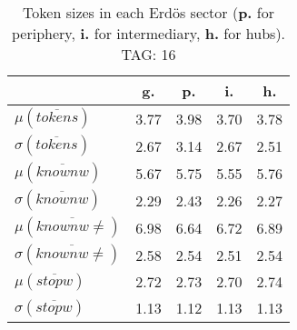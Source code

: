 \begin{table}[h!]
\begin{center}
\begin{tabular}{| l | c | c | c | c |}\hline
 & g. & p. & i. & h. \\\hline
$\mu(\overline{tokens})$ & 3.77  & 3.98  & 3.70  & 3.78 \\\hline
$\sigma(\overline{tokens})$ & 2.67  & 3.14  & 2.67  & 2.51 \\\hline
$\mu(\overline{knownw})$ & 5.67  & 5.75  & 5.55  & 5.76 \\\hline
$\sigma(\overline{knownw})$ & 2.29  & 2.43  & 2.26  & 2.27 \\\hline
$\mu(\overline{knownw \neq})$ & 6.98  & 6.64  & 6.72  & 6.89 \\\hline
$\sigma(\overline{knownw \neq})$ & 2.58  & 2.54  & 2.51  & 2.54 \\\hline
$\mu(\overline{stopw})$ & 2.72  & 2.73  & 2.70  & 2.74 \\\hline
$\sigma(\overline{stopw})$ & 1.13  & 1.12  & 1.13  & 1.13 \\\hline
\end{tabular}
\caption{Token sizes in each Erd\"os sector ({{\bf p.}} for periphery, {{\bf i.}} for intermediary, {{\bf h.}} for hubs). TAG: 16}
\end{center}
\end{table}